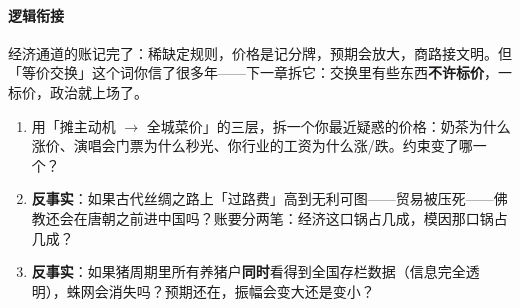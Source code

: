 \documentclass[../../main2.tex]{subfiles}
\begin{document}
\paragraph*{逻辑衔接}
	经济通道的账记完了：稀缺定规则，价格是记分牌，预期会放大，商路接文明。但「等价交换」这个词你信了很多年——下一章拆它：交换里有些东西\textbf{不许标价}，一标价，政治就上场了。

\begin{thinkbox}
\begin{enumerate}
	\item 用「摊主动机 $\rightarrow$ 全城菜价」的三层，拆一个你最近疑惑的价格：奶茶为什么涨价、演唱会门票为什么秒光、你行业的工资为什么涨/跌。约束变了哪一个？
	\item \textbf{反事实}：如果古代丝绸之路上「过路费」高到无利可图——贸易被压死——佛教还会在唐朝之前进中国吗？账要分两笔：经济这口锅占几成，模因那口锅占几成？
	\item \textbf{反事实}：如果猪周期里所有养猪户\textbf{同时}看得到全国存栏数据（信息完全透明），蛛网会消失吗？预期还在，振幅会变大还是变小？
\end{enumerate}
\end{thinkbox}
\end{document}
